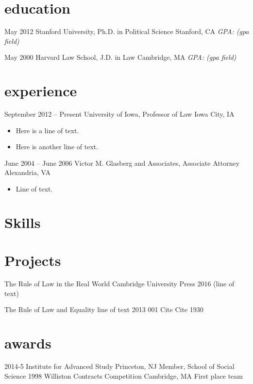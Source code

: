 \documentclass[]{friggeri-cv}
\begin{document}
\section{education}
\begin{entrylist}
	
	\entry
	{May 2012}
	{Stanford University, {\normalfont Ph.D. in Political Science}}
	{Stanford, CA}
	{\emph{GPA: (gpa field)}}
	  
	
	\entry
	{May 2000}
	{Harvard Law School, {\normalfont J.D. in Law}}
	{Cambridge, MA}
	{\emph{GPA: (gpa field)}}
	  
\end{entrylist}
\section{experience}
\begin{entrylist}
	      
	\entry
	{September 2012 – Present}
	{University of Iowa, Professor of Law}
	{Iowa City, IA}
	{\vspace{-3mm}\begin{itemize}[leftmargin=10pt,itemsep=4pt]
		\item Here is a line of text.
		\item Here is another line of text.
		\end{itemize}}
	        
	      
	\entry
	{June 2004 – June 2006}
	{Victor M. Glasberg and Associates, Associate Attorney}
	{Alexandria, VA}
	{\vspace{-3mm}\begin{itemize}[leftmargin=10pt,itemsep=4pt]
		\item Line of text.
		\end{itemize}}
	        
\end{entrylist}
\section{Skills}
\begin{entrylist}
\end{entrylist}
\section{Projects}
\begin{entrylist}
	
	\entry
	{}
	{The Rule of Law in the Real World {\normalfont Cambridge University Press}}
	{2016}
	{(line of text)}
	  
	
	\entry
	{}
	{The Rule of Law and Equality {\normalfont line of text}}
	{2013}
	{001 Cite Cite 1930}
	  
\end{entrylist}
\section{awards}
\begin{entrylist}
	\entry
	{2014-5}
	{Institute for Advanced Study}
	{Princeton, NJ}
	{Member, School of Social Science}
	\entry
	{1998}
	{Williston Contracts Competition}
	{Cambridge, MA}
	{First place team}
\end{entrylist}
\ 
\end{document}
